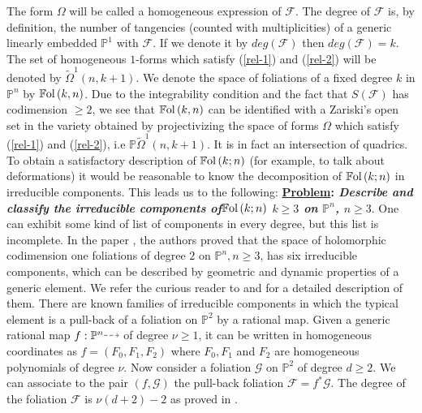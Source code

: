 \documentclass{amsart}
\theoremstyle{definition}
\theoremstyle{proposition}
\numberwithin{equation}{section}
\theoremstyle{main}
\begin{document}
The form $\Omega$ will be called a homogeneous expression of $\mathcal F.$
The degree of $\mathcal F$ is, by definition, the number of tangencies (counted with multiplicities) of a generic linearly embedded $\mathbb P^1$ with $\mathcal F.$ If we denote it by $deg(\mathcal F)$ then $deg\left(\mathcal F\right)=k.$ The set of homogeneous $1$-forms which satisfy (\ref{rel-1}) and (\ref{rel-2}) will be denoted by $\tilde\Omega^1(n,k+1)$. We denote the space of foliations of a fixed degree $k$ in  $\mathbb P^n$ by $\mathbb{F}{\rm{ol}}\left(k,n\right)$. Due to the integrability condition and the fact that $S\left(\mathcal F\right)$ has codimension $\geq2$, we see that $\mathbb{F}{\rm{ol}}\left(k,n\right)$ can be identified with a Zariski's open set in the variety obtained by projectivizing the space of forms $\Omega$ which satisfy (\ref{rel-1}) and (\ref{rel-2}), i.e $\mathbb P\tilde\Omega^1(n,k+1)$. It is in fact an intersection of quadrics. To obtain a satisfactory description of $\mathbb{F}{\rm{ol}}\left(k;n\right)$ (for example, to talk about deformations) it would be reasonable to know the decomposition of $\mathbb{F}{\rm{ol}}\left(k;n\right)$ in irreducible components. This leads us to the following:
\vskip0.2cm
\noindent \textbf{{\underline{Problem}: \emph{Describe and classify the irreducible components of\break $\mathbb{F}{\rm{ol}}\left(k;n\right)$ $k\geq 3$ on ${\mathbb P^n}$, $n\geq 3.$}}}
\vskip0.2cm
One can exhibit some kind of list of components in every degree, but this list is incomplete.  In the  paper \cite{cln}, the authors proved that the space of holomorphic codimension one foliations of degree $2$ on  ${\mathbb P^n}, n\geq 3$, has six irreducible components, which can be described by geometric and dynamic properties of a generic element. We refer the curious reader to \cite{cln} and \cite{ln}  for a detailed description of them.
 There are known families of irreducible components in which the typical element is a pull-back of a foliation on ${\mathbb P^2}$ by a rational map. Given a generic rational map $f: {\mathbb P^n}  {\mathbin{\tikz [baseline=-0.25ex,-latex, dashed,->,densely dashed    ] \draw [->,densely dashed    ] (0pt,
0.5ex) -- (1.3em,0.5ex);}}$ of degree $\nu\geq1$, it can be written in homogeneous coordinates as $f=(F_0,F_1,F_2)$ where $F_0,F_1$ and $F_2$ are homogeneous polynomials of degree $\nu$. Now consider a foliation $\mathcal G$ on ${\mathbb P^2}$ of degree $d\geq2.$ We can associate to the pair $(f,\mathcal G)$ the pull-back foliation $\mathcal F=f^{\ast}\mathcal G$.
The degree of the foliation $\mathcal F$ is $\nu(d+2)-2$ as proved in \cite{clne}.
\end{document}
